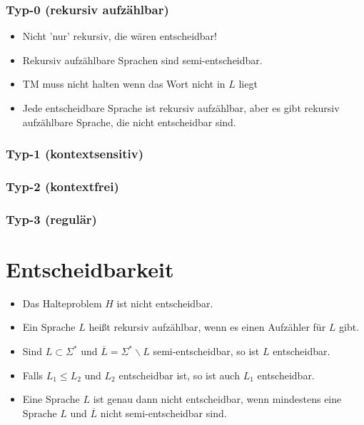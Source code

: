 \subsubsection{Typ-0 (rekursiv aufzählbar)}

\begin{itemize}
	\item Nicht 'nur' rekursiv, die wären entscheidbar!
	\item Rekursiv aufzählbare Sprachen sind semi-entscheidbar.
	\item TM muss nicht halten wenn das Wort nicht in $L$ liegt
	\item Jede entscheidbare Sprache ist rekursiv aufzählbar, aber es gibt rekursiv aufzählbare Sprache, die nicht entscheidbar sind.
\end{itemize}

\subsubsection{Typ-1 (kontextsensitiv)}

\subsubsection{Typ-2 (kontextfrei)}

\subsubsection{Typ-3 (regulär)}


\section{Entscheidbarkeit}

\begin{itemize}
	\item Das Halteproblem $H$ ist nicht entscheidbar.
	\item Ein Sprache $L$ heißt rekursiv aufzählbar, wenn es einen Aufzähler für $L$ gibt.
	\item Sind $L \subset \Sigma^*$ und $\overline{L}=\Sigma^*\backslash L$ semi-entscheidbar, so ist $L$ entscheidbar.
	\item Falls $L_1 \leq L_2$ und $L_2$ entscheidbar ist, so ist auch $L_1$ entscheidbar.
	\item Eine Sprache $L$ ist genau dann nicht entscheidbar, wenn mindestens eine Sprache $L$ und $\overline{L}$ nicht semi-entscheidbar sind.
\end{itemize}

